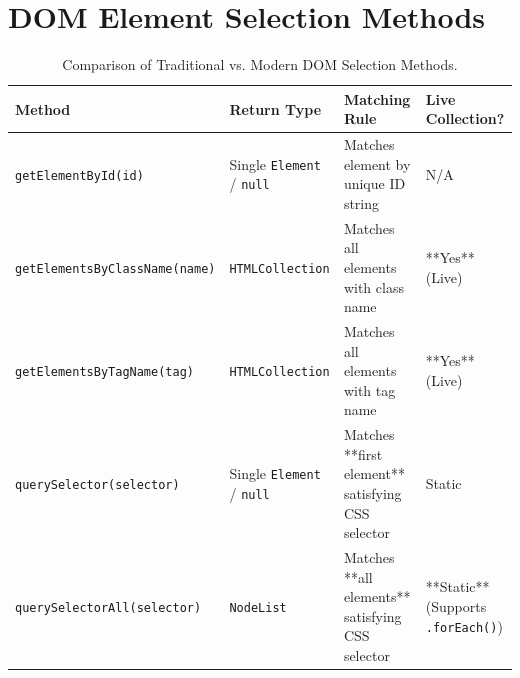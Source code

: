 \section{DOM Element Selection Methods}

\begin{table}[htbp]
\centering
\small
\renewcommand{\arraystretch}{1.3}
\begin{tabularx}{\linewidth}{ll>{\raggedright\arraybackslash}Xl}
\toprule
\textbf{Method} & \textbf{Return Type} & \textbf{Matching Rule} & \textbf{Live Collection?} \\
\midrule
\texttt{getElementById(id)} & Single \texttt{Element} / \texttt{null} & Matches element by unique ID string & N/A \\
\texttt{getElementsByClassName(name)} & \texttt{HTMLCollection} & Matches all elements with class name & **Yes** (Live) \\
\texttt{getElementsByTagName(tag)} & \texttt{HTMLCollection} & Matches all elements with tag name & **Yes** (Live) \\
\texttt{querySelector(selector)} & Single \texttt{Element} / \texttt{null} & Matches **first element** satisfying CSS selector & Static \\
\texttt{querySelectorAll(selector)} & \texttt{NodeList} & Matches **all elements** satisfying CSS selector & **Static** (Supports \texttt{.forEach()}) \\
\bottomrule
\end{tabularx}
\caption{Comparison of Traditional vs. Modern DOM Selection Methods.}
\label{tab:dom-selectors}
\end{table}



